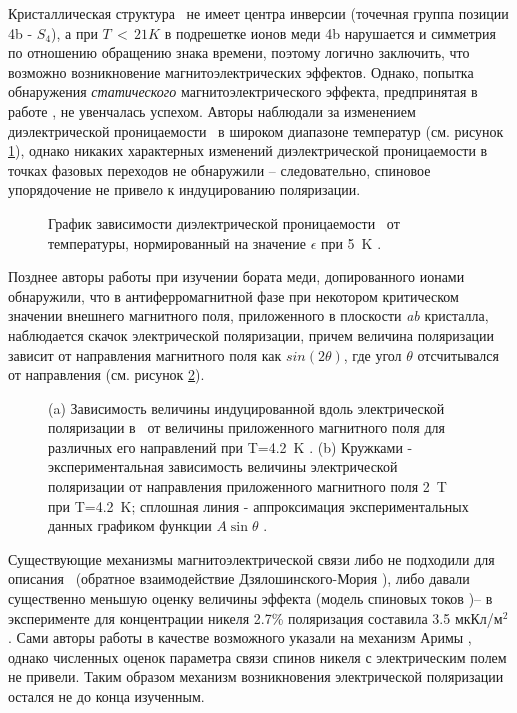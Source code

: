 Кристаллическая структура \cbo\ не имеет центра инверсии (точечная группа позиции 4b - \(S_4\)), а при \(T\,{<}\,21K\) в подрешетке ионов меди 4b нарушается и симметрия по отношению обращению знака времени, поэтому логично заключить, что возможно возникновение магнитоэлектрических эффектов. Однако, попытка обнаружения \emph{статического} магнитоэлектрического эффекта, предпринятая в работе \cite{Nenert2007}, не увенчалась успехом. Авторы наблюдали за изменением диэлектрической проницаемости \cbo\ в широком диапазоне температур (см. рисунок \cref{fig:nenert}), однако никаких характерных изменений диэлектрической проницаемости в точках фазовых переходов не обнаружили -- следовательно, спиновое упорядочение не привело к индуцированию поляризации.

\begin{figure}[ht]
	\label{fig:nenert}
	\caption{График зависимости диэлектрической проницаемости \cbo\ от температуры, нормированный на значение $\epsilon$ при \SI{5}{\kelvin} \cite{Nenert2007}.}
\end{figure}

Позднее авторы работы \cite{Khan2013} при изучении бората меди, допированного ионами \niIon\, обнаружили, что в антиферромагнитной фазе при некотором критическом значении внешнего магнитного поля, приложенного в плоскости \textit{ab} кристалла, наблюдается скачок электрической поляризации, причем величина поляризации зависит от направления магнитного поля как \(sin\left(2\theta\right)\), где угол \(\theta\) отсчитывался от направления  (см. рисунок \cref{fig:khan}).

\begin{figure}[ht]
	\label{fig:khan}
	\caption{(a) Зависимость величины индуцированной вдоль  электрической поляризации в \ncbo\ от величины приложенного магнитного поля для различных его направлений при T=\SI{4.2}{\kelvin} \cite{Nenert2007}. (b) Кружками - экспериментальная зависимость величины электрической поляризации от направления приложенного магнитного поля \SI{2}{\tesla} при T=\SI{4.2}{\kelvin}; сплошная линия - аппроксимация экспериментальных данных графиком функции $A\sin\theta$ \cite{Nenert2007}.}
\end{figure} 

Существующие механизмы магнитоэлектрической связи либо не подходили для описания \cbo\ (обратное взаимодействие Дзялошинского-Мория \cite{Sergienko2006}), либо давали существенно меньшую оценку величины эффекта (модель спиновых токов \cite{Katsura2005})– в эксперименте для концентрации никеля 2.7\% поляризация составила 3.5 мкКл/м\(^2\). Сами авторы работы \cite{Khan2013} в качестве возможного указали на механизм Аримы \cite{Arima2007}, однако численных оценок параметра связи спинов никеля с электрическим полем не привели. Таким образом механизм возникновения электрической поляризации остался не до конца изученным.

